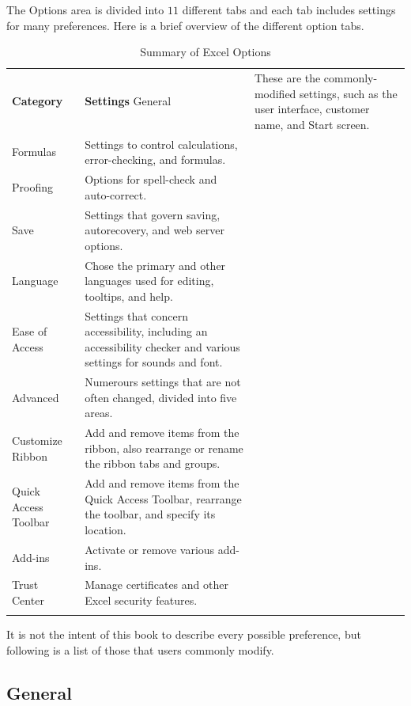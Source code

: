 The Options area is divided into $ 11 $ different tabs and each tab includes settings for many preferences. Here is a brief overview of the different option tabs.

\begin{table}[H]
	{\small
		\begin{longtable}{L{1.00in}L{3.00in}} %
			\textbf{Category} & \textbf{Settings} \endhead
			\hline
			General & These are the commonly-modified settings, such as the user interface, customer name, and Start screen.\\
			Formulas & Settings to control calculations, error-checking, and formulas.\\
			Proofing & Options for spell-check and auto-correct.\\
			Save & Settings that govern saving, autorecovery, and web server options.\\
			Language & Chose the primary and other languages used for editing, tooltips, and help.\\
			Ease of Access & Settings that concern accessibility, including an accessibility checker and various settings for sounds and font.\\
			Advanced & Numerours settings that are not often changed, divided into five areas.\\
			Customize Ribbon & Add and remove items from the ribbon, also rearrange or rename the ribbon tabs and groups.\\
			Quick Access Toolbar & Add and remove items from the Quick Access Toolbar, rearrange the toolbar, and specify its location.\\
			Add-ins & Activate or remove various add-ins.\\
			Trust Center & Manage certificates and other Excel security features.\\
			\caption{Summary of Excel Options}
			\label{09:tab03}
		\end{longtable}
	} %
\end{table}

It is not the intent of this book to describe every possible preference, but following is a list of those that users commonly modify.

\subsection{General}

